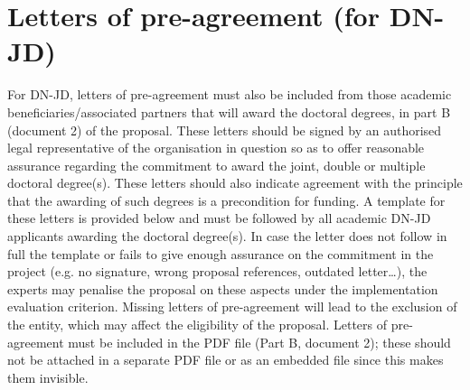 \documentclass[11pt]{article}
\begin{document}
\section{Letters of  pre-agreement (for DN-JD)}

For DN-JD, letters of pre-agreement must also be included from those academic beneficiaries/associated partners that will award the doctoral degrees, in part B (document 2) of the proposal. These letters should be signed by an authorised legal representative of the organisation in question so as to offer reasonable assurance regarding the commitment to award the joint, double or multiple doctoral degree(s). These letters should also indicate agreement with the principle that the awarding of such degrees is a precondition for funding. A template for these letters is provided below and must be followed by all academic DN-JD applicants awarding the doctoral degree(s). 
In case the letter does not follow in full the template or fails to give enough assurance on the commitment in the project (e.g. no signature, wrong proposal references, outdated letter…), the experts may penalise the proposal on these aspects under the implementation evaluation criterion. Missing letters of pre-agreement will lead to the exclusion of the entity, which may affect the eligibility of the proposal.
Letters of pre-agreement must be included in the PDF file (Part B, document 2); these should not be attached in a separate PDF file or as an embedded file since this makes them invisible.






\newpage

\end{document}
